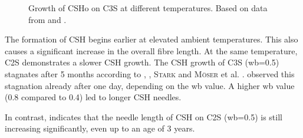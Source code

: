 \begin{figure}[!htb]
    \caption{Growth of \ac{CSHo} on \ac{C3S} at different temperatures. Based on data from \textcite{voland.2000} and \textcite{suess.2001}.}
    \label{fig:suess_CSH_C3S}
\end{figure}

The formation of \ac{CSH} begins earlier at elevated ambient temperatures.
This also causes a significant increase in the overall fibre length.
At the same temperature, \ac{C2S} demonstrates a slower \ac{CSH} growth.
The \ac{CSH} growth of \ac{C3S} (\ac{wb}=\num{0.5}) stagnates after \num{5} months according to \textcite{voland.2000}, \textcite{suess.2001}, \textsc{Stark} and \textsc{Möser} et al. \cite{stark.2001,moser.2002}.
\textcite{bazzoni.2014} observed this stagnation already after one day, depending on the \ac{wb} value.
A higher \ac{wb} value (\num{0.8} compared to \num{0.4}) led to longer \ac{CSH} needles.

In contrast, \textcite{moser.2002} indicates that the needle length of \ac{CSH} on \ac{C2S} (\ac{wb}=\num{0.5}) is still increasing significantly, even up to an age of \num{3} years.



